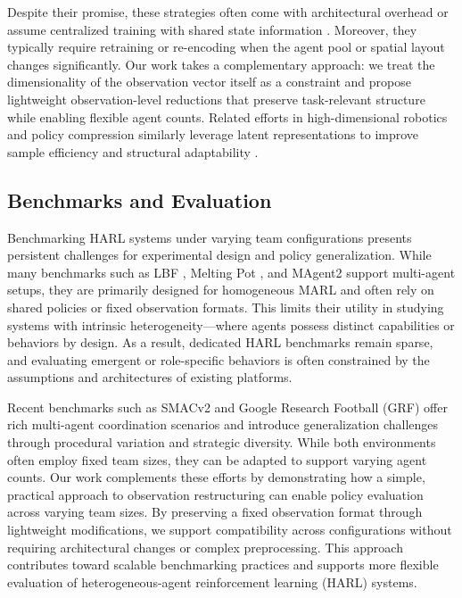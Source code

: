 \documentclass{article}
\begin{document}
Despite their promise, these strategies often come with architectural overhead or assume 
centralized training with shared state information \cite{foerster2017}. 
Moreover, they typically require retraining or re-encoding when the agent pool or spatial 
layout changes significantly. Our work takes a complementary approach: 
we treat the dimensionality of the observation vector itself as a constraint and propose 
lightweight observation-level reductions that preserve task-relevant structure 
while enabling flexible agent counts. 
Related efforts in high-dimensional robotics and policy compression similarly leverage 
latent representations to improve sample efficiency and structural adaptability 
\cite{bitzer2010, tangkaratt2016}.



\subsection{Benchmarks and Evaluation}

Benchmarking HARL systems under varying team configurations presents persistent
challenges for experimental design and policy generalization. While many benchmarks 
such as LBF \cite{papoudakis2021}, Melting Pot \cite{leibo2021}, and MAgent2 \cite{zheng2017} 
support multi-agent setups, they are primarily designed for homogeneous MARL 
and often rely on shared policies or fixed observation formats. This limits 
their utility in studying systems with intrinsic heterogeneity—where agents possess 
distinct capabilities or behaviors by design. As a result, dedicated HARL benchmarks 
remain sparse, and evaluating emergent or role-specific behaviors is often constrained 
by the assumptions and architectures of existing platforms.

Recent benchmarks such as SMACv2 \cite{ellis2023} and 
Google Research Football (GRF) \cite{kurach2020} offer rich multi-agent coordination scenarios 
and introduce generalization challenges through procedural variation and strategic diversity. 
While both environments often employ fixed team sizes, 
they can be adapted to support varying agent counts.
Our work complements these efforts by demonstrating how a simple, practical approach to observation 
restructuring can enable policy evaluation across varying team sizes. By preserving a fixed 
observation format through lightweight modifications, we support compatibility across configurations 
without requiring architectural changes or complex preprocessing.
This approach contributes toward scalable benchmarking practices and supports 
more flexible evaluation of heterogeneous-agent reinforcement learning (HARL) systems.
\end{document}
